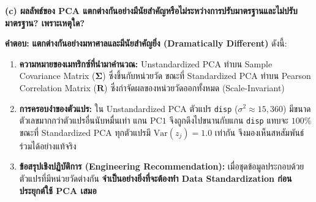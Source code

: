 \begin{tcolorbox}
\noindent\textbf{\normalsize (c) ผลลัพธ์ของ PCA แตกต่างกันอย่างมีนัยสำคัญหรือไม่ระหว่างการปรับมาตรฐานและไม่ปรับมาตรฐาน? เพราะเหตุใด?}\par\vspace{0.1em}
\textbf{คำตอบ:} \textbf{แตกต่างกันอย่างมหาศาลและมีนัยสำคัญยิ่ง (Dramatically Different)} ดังนี้:
\begin{enumerate}[leftmargin=1.2em, itemsep=0.5pt, topsep=0.5pt]
    \item \textbf{ความหมายของเมทริกซ์ที่นำมาคำนวณ:} Unstandardized PCA ทำบน Sample Covariance Matrix ($\boldsymbol{\Sigma}$) ซึ่งขึ้นกับหน่วยวัด ขณะที่ Standardized PCA ทำบน Pearson Correlation Matrix ($\mathbf{R}$) ซึ่งกำจัดผลของหน่วยวัดออกทั้งหมด (Scale-Invariant)
    \item \textbf{การครอบงำของตัวแปร:} ใน Unstandardized PCA ตัวแปร \texttt{disp} ($\sigma^2 \approx 15,360$) มีขนาดตัวเลขมากกว่าตัวแปรอื่นนับหมื่นเท่า แกน $\text{PC1}$ จึงถูกดึงไปขนานกับแกน \texttt{disp} แทบจะ $100\%$ ขณะที่ Standardized PCA ทุกตัวแปรมี $\text{Var}(z_j) = 1.0$ เท่ากัน จึงมองเห็นสหสัมพันธ์ร่วมได้อย่างแท้จริง
    \item \textbf{ข้อสรุปเชิงปฏิบัติการ (Engineering Recommendation):} เมื่อชุดข้อมูลประกอบด้วยตัวแปรที่มีหน่วยวัดต่างกัน \textbf{จำเป็นอย่างยิ่งที่จะต้องทำ Data Standardization ก่อนประยุกต์ใช้ PCA เสมอ}
\end{enumerate}
\end{tcolorbox}

